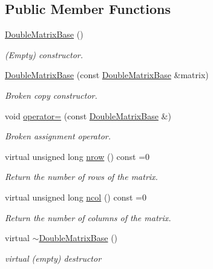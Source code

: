 \subsection*{Public Member Functions}
\begin{DoxyCompactItemize}
\item 
\hyperlink{classoomph_1_1DoubleMatrixBase_a9ab2dcaf990403cd43d4b952f7dbaa1c}{Double\+Matrix\+Base} ()
\begin{DoxyCompactList}\small\item\em (Empty) constructor. \end{DoxyCompactList}\item 
\hyperlink{classoomph_1_1DoubleMatrixBase_a9ac04a27de856720ef6478df71b1505a}{Double\+Matrix\+Base} (const \hyperlink{classoomph_1_1DoubleMatrixBase}{Double\+Matrix\+Base} \&matrix)
\begin{DoxyCompactList}\small\item\em Broken copy constructor. \end{DoxyCompactList}\item 
void \hyperlink{classoomph_1_1DoubleMatrixBase_a107b48a28db1ab8696e794e3d398a02e}{operator=} (const \hyperlink{classoomph_1_1DoubleMatrixBase}{Double\+Matrix\+Base} \&)
\begin{DoxyCompactList}\small\item\em Broken assignment operator. \end{DoxyCompactList}\item 
virtual unsigned long \hyperlink{classoomph_1_1DoubleMatrixBase_acdcd6e1ea2bf2380f1a2fa32c7829cb5}{nrow} () const =0
\begin{DoxyCompactList}\small\item\em Return the number of rows of the matrix. \end{DoxyCompactList}\item 
virtual unsigned long \hyperlink{classoomph_1_1DoubleMatrixBase_a253feffbf1db1976cdd86c6134c50abe}{ncol} () const =0
\begin{DoxyCompactList}\small\item\em Return the number of columns of the matrix. \end{DoxyCompactList}\item 
virtual \hyperlink{classoomph_1_1DoubleMatrixBase_a82ece2e3cfc355bb68ba78a2ed9dae9f}{$\sim$\+Double\+Matrix\+Base} ()
\begin{DoxyCompactList}\small\item\em virtual (empty) destructor \end{DoxyCompactList}\item 

\end{DoxyCompactItemize}
